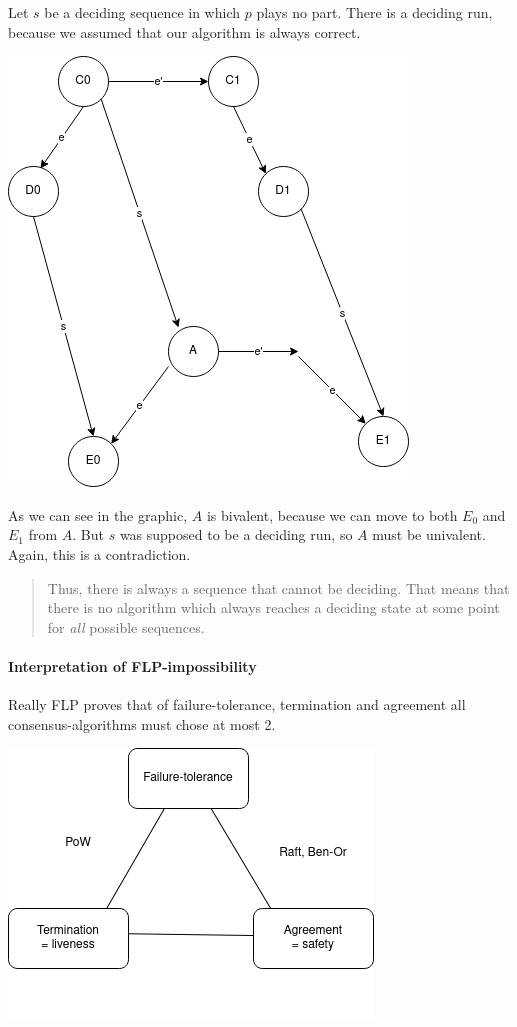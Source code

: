 Let \(s\) be a deciding sequence in which \(p\) plays no part. There is
a deciding run, because we assumed that our algorithm is always correct.

\includegraphics{images/flp_lemma_34.png}


As we can see in the graphic, \(A\) is bivalent, because we can move to
both \(E_0\) and \(E_1\) from \(A\). But \(s\) was supposed to be a
deciding run, so \(A\) must be univalent. Again, this is a
contradiction.

\begin{quote}
Thus, there is always a sequence that cannot be deciding. That means
that there is no algorithm which always reaches a deciding state at some
point for \emph{all} possible sequences.
\end{quote}

\hypertarget{interpretation-of-flp-impossibility}{%
\paragraph{Interpretation of
FLP-impossibility}\label{interpretation-of-flp-impossibility}}

Really FLP proves that of failure-tolerance, termination and agreement
all consensus-algorithms must chose at most 2.

\includegraphics{images/flp_triangle.png}


